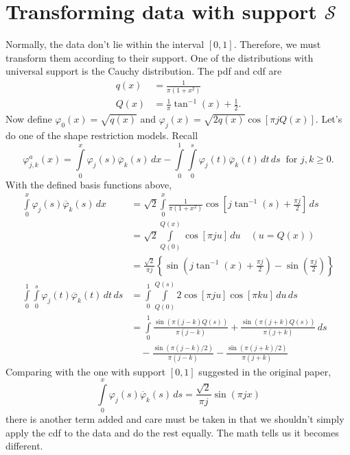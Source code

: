 \documentclass[11pt]{article}
\begin{document}
\section{Transforming data with support $\mathcal{S}$}
Normally, the data don't lie within the interval $\left[0,1\right]$. Therefore, we must transform them according to their support. One of the distributions with universal support is the Cauchy distribution. The pdf and cdf are
\begin{align}
  q\left(x\right) &= \frac{1}{\pi\left(1+x^{2}\right)}\\
  Q\left(x\right) &= \frac{1}{\pi}\tan^{-1}\left(x\right) + \frac{1}{2}.
\end{align}
Now define $\varphi_{0}\left(x\right) = \sqrt{q\left(x\right)}$ and $\varphi_{j}\left(x\right) = \sqrt{2q\left(x\right)}\cos\left[\pi jQ\left(x\right)\right]$. Let's do one of the shape restriction models. Recall
\begin{equation}
  \varphi_{j,k}^{a}\left(x\right) = \int\limits_{0}^{x}\varphi_{j}\left(s\right)\overline{\varphi}_{k}\left(s\right)\,dx - \int\limits_{0}^{1}\int\limits_{0}^{s}\varphi_{j}\left(t\right)\overline{\varphi}_{k}\left(t\right)\,dt\,ds\;\; \text{for $j, k \geq 0$}.
\end{equation}
With the defined basis functions above,
\begin{align}
  \int\limits_{0}^{x}\varphi_{j}\left(s\right)\overline{\varphi}_{k}\left(s\right)\,dx &= \sqrt{2}\int\limits_{0}^{x} \frac{1}{\pi\left(1+x^{2}\right)}\cos \left[j\tan^{-1}\left(s\right)+\frac{\pi j}{2}\right]\,ds\\
  &= \sqrt{2}\int\limits_{Q\left(0\right)}^{Q\left(x\right)}\cos\left[\pi ju\right]\,du\quad \left(u = Q\left(x\right)\right)\\
  &= \frac{\sqrt{2}}{\pi j}\left\{\sin\left(j\tan^{-1}\left(x\right) + \frac{\pi j}{2}\right) - \sin \left(\frac{\pi j}{2}\right) \right\}\\
  \int\limits_{0}^{1}\int\limits_{0}^{s} \varphi_{j}\left(t\right)\overline{\varphi}_{k}\left(t\right)\,dt\,ds &= \int\limits_{0}^{1}\int\limits_{Q\left(0\right)}^{Q\left(s\right)}2\cos\left[\pi ju\right]\cos\left[\pi ku\right]\,du\,ds \\
  &= \int\limits_{0}^{1}\frac{\sin\left(\pi\left(j-k\right)Q\left(s\right)\right)}{\pi\left(j-k\right)}+\frac{\sin\left(\pi\left(j+k\right)Q\left(s\right)\right)}{\pi\left(j+k\right)} \,ds\\
  &\quad - \frac{\sin\left(\pi\left(j-k\right)/2\right)}{\pi\left(j-k\right)}-\frac{\sin\left(\pi\left(j+k\right)/2\right)}{\pi\left(j+k\right)}
\end{align}
Comparing with the one with support $\left[0,1\right]$ suggested in the original paper,
\begin{equation}
  \int\limits_{0}^{x}\varphi_{j}\left(s\right)\overline{\varphi}_{k}\left(s\right)\,ds = \frac{\sqrt{2}}{\pi j}\sin\left(\pi j x\right)
\end{equation}
there is another term added and care must be taken in that we shouldn't simply apply the cdf to the data and do the rest equally. The math tells us it becomes different.
\end{document}
